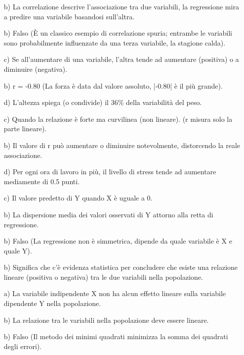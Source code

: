 \documentclass[12pt, a4paper]{article}
\begin{document}
\begin{enumerate}
    \item[b)]  La correlazione descrive l'associazione tra due variabili, la regressione mira a predire una variabile basandosi sull'altra.
    \item[b)]  Falso (È un classico esempio di correlazione spuria; entrambe le variabili sono probabilmente influenzate da una terza variabile, la stagione calda).
    \item[c)]  Se all'aumentare di una variabile, l'altra tende ad aumentare (positiva) o a diminuire (negativa).
    \item[b)]  r = -0.80 (La forza è data dal valore assoluto, |-0.80| è il più grande).
    \item[d)]  L'altezza spiega (o condivide) il 36\% della variabilità del peso.
    \item[c)]  Quando la relazione è forte ma curvilinea (non lineare). (r misura solo la parte lineare).
    \item[b)]  Il valore di r può aumentare o diminuire notevolmente, distorcendo la reale associazione.
    \item[d)]  Per ogni ora di lavoro in più, il livello di stress tende ad aumentare mediamente di 0.5 punti.
    \item[c)]  Il valore predetto di Y quando X è uguale a 0.
    \item[b)]  La dispersione media dei valori osservati di Y attorno alla retta di regressione.
    \item[b)]  Falso (La regressione non è simmetrica, dipende da quale variabile è X e quale Y).
    \item[b)]  Significa che c'è evidenza statistica per concludere che esiste una relazione lineare (positiva o negativa) tra le due variabili nella popolazione.
    \item[a)]  La variabile indipendente X non ha alcun effetto lineare sulla variabile dipendente Y nella popolazione.
    \item[b)]  La relazione tra le variabili nella popolazione deve essere lineare.
    \item[b)]  Falso (Il metodo dei minimi quadrati minimizza la somma dei quadrati degli errori).
          

\end{enumerate}
\end{document}
